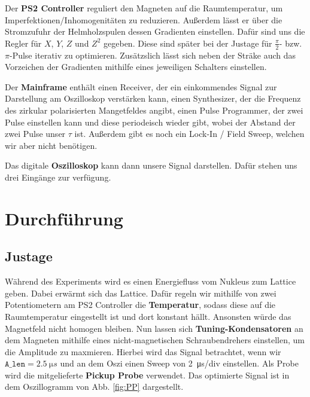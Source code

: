 \documentclass[10pt]{article}
\begin{document}
\begin{multicols}{2}
  Der \textbf{PS2 Controller} reguliert den Magneten auf die Raumtemperatur, um Imperfektionen/Inhomogenitäten zu reduzieren. Außerdem lässt er über die Stromzufuhr der Helmholzspulen dessen Gradienten einstellen. Dafür sind uns die Regler für $X$, $Y$, $Z$ und $Z^2$ gegeben. Diese sind später bei der Justage für $\frac{\pi}{2}$- bzw. $\pi$-Pulse iterativ zu optimieren. Zusätzslich lässt sich neben der Sträke auch das Vorzeichen der Gradienten mithilfe eines jeweiligen Schalters einstellen.

  Der \textbf{Mainframe} enthält einen Receiver, der ein einkommendes Signal zur Darstellung am Oszilloskop verstärken kann, einen Synthesizer, der die Frequenz des zirkular polarisierten Mangetfeldes angibt, einen Pulse Programmer, der zwei Pulse einstellen kann und diese periodeisch wieder gibt, wobei der Abstand der zwei Pulse unser $\tau$ ist. Außerdem gibt es noch ein Lock-In / Field Sweep, welchen wir aber nicht benötigen.

  Das digitale \textbf{Oszilloskop} kann dann unsere Signal darstellen. Dafür stehen uns drei Eingänge zur verfügung. 

  \section{Durchführung}
  \subsection{Justage}
  Während des Experiments wird es einen Energiefluss vom Nukleus zum Lattice geben. Dabei erwärmt sich das Lattice. Dafür regeln wir mithilfe von zwei Potentiometern am PS2 Controller die \textbf{Temperatur}, sodass diese auf die Raumtemperatur eingestellt ist und dort konstant hällt. Ansonsten würde das Magnetfeld nicht homogen bleiben. Nun lassen sich \textbf{Tuning-Kondensatoren} an dem Magneten mithilfe eines nicht-magnetischen Schraubendrehers einstellen, um die Amplitude zu maxmieren. Hierbei wird das Signal betrachtet, wenn wir $\texttt{A_len}=\SI{2.5}{\micro s}$ und an dem Oszi einen Sweep von \SI{2}{\micro s/div} einstellen. Als Probe wird die mitgelieferte \textbf{Pickup Probe} verwendet. Das optimierte Signal ist in dem Oszillogramm von Abb. \ref{fig:PP} dargestellt.
  

\end{multicols}
\end{document}
